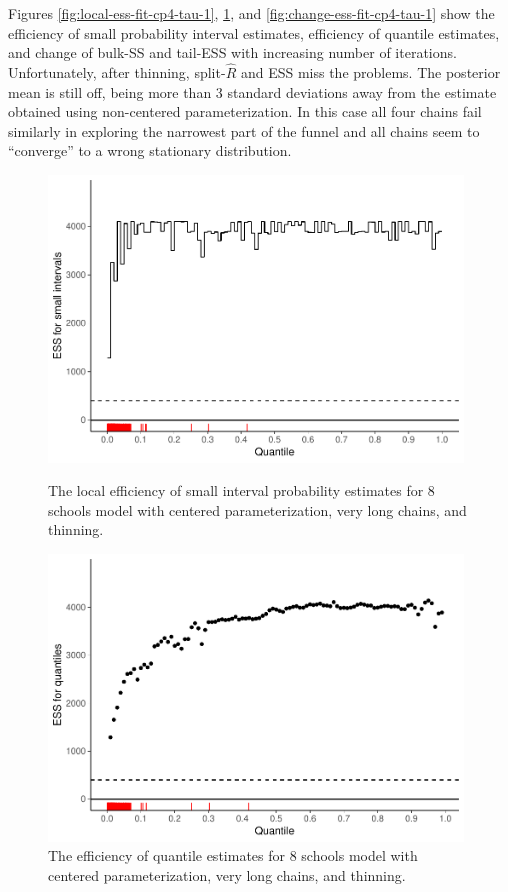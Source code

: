 \documentclass[american,]{article}
\theoremstyle{definition}
\begin{document}
Figures \ref{fig:local-ess-fit-cp4-tau-1},
\ref{fig:quantile-ess-fit-cp4-tau-1}, and
\ref{fig:change-ess-fit-cp4-tau-1} show the efficiency of small
probability interval estimates, efficiency of quantile estimates, and
change of bulk-SS and tail-ESS with increasing number of iterations.
Unfortunately, after thinning, split-\(\widehat{R}\) and ESS
miss the problems. The posterior mean is still off,
being more than 3 standard deviations away from the estimate obtained using
non-centered parameterization. In this case all four chains fail
similarly in exploring the narrowest part of the funnel and all
chains seem to ``converge'' to a wrong stationary distribution.
\begin{figure}[tp]
  \centering
  \begin{minipage}{0.48\textwidth}
  \includegraphics[width=0.98\textwidth]{graphics/local-ess-fit-cp4-tau-1.pdf}
  \caption{The local efficiency of small interval probability estimates for 8 schools model with centered parameterization, very long chains, and thinning.}
  \label{fig:local-ess-fit-cp4-tau-1}
\end{minipage}
\hfill
  \begin{minipage}{0.48\textwidth}
  \includegraphics[width=0.98\textwidth]{graphics/quantile-ess-fit-cp4-tau-1.pdf}
  \caption{The efficiency of quantile estimates for 8 schools model with centered parameterization, very long chains, and thinning.}
  \label{fig:quantile-ess-fit-cp4-tau-1}
\end{minipage}
\end{figure}
\end{document}
